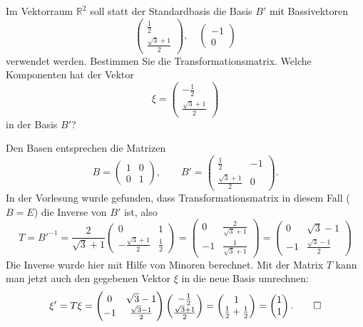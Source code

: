 Im Vektorraum $\mathbb R^2$ soll statt der Standardbasis die Basis $B'$ mit
Bassivektoren
\[
\begin{pmatrix}
\frac12\\
\frac{\sqrt{3}+1}2
\end{pmatrix},\quad
\begin{pmatrix}
-1\\
0
\end{pmatrix}
\]
verwendet werden.
Bestimmen Sie die Transformationsmatrix.
Welche Komponenten hat der Vektor
\[
\xi=
\begin{pmatrix}
-\frac12\\
\frac{\sqrt{3}+1}2
\end{pmatrix}
\]
in der Basis $B'$?


\begin{loesung}
Den Basen entsprechen die Matrizen
\[
B=\begin{pmatrix}1&0\\0&1\end{pmatrix},\qquad
B'=\begin{pmatrix}
\frac12&-1\\
\frac{\sqrt{3}+1}2&0
\end{pmatrix}.
\]
In der Vorlesung wurde gefunden, dass Transformationsmatrix in diesem
Fall ($B=E$) die Inverse von $B'$ ist, also
\[
T=B'^{-1}=\frac2{\sqrt{3}+1}\begin{pmatrix}
0&1\\
-\frac{\sqrt{3}+1}2&\frac12
\end{pmatrix}
=\begin{pmatrix}
0&\frac{2}{\sqrt{3}+1}\\
-1&\frac1{\sqrt{3}+1}
\end{pmatrix}
=
\begin{pmatrix}
0&\sqrt{3}-1\\
-1&\frac{\sqrt{3}-1}{2}
\end{pmatrix}
\]
Die Inverse wurde hier mit Hilfe von Minoren berechnet.
Mit der Matrix $T$ kann man jetzt auch den gegebenen Vektor $\xi$  in
die neue Basis umrechnen:
\[
\xi'=
T\xi
=
\begin{pmatrix}
0&\sqrt{3}-1\\
-1&\frac{\sqrt{3}-1}{2}
\end{pmatrix}
\begin{pmatrix}
-\frac12\\
\frac{\sqrt{3}+1}2
\end{pmatrix}
=
\begin{pmatrix}1\\
\frac12+\frac12\end{pmatrix}
=\begin{pmatrix}1\\1\end{pmatrix}.
\qedhere
\]
\end{loesung}

